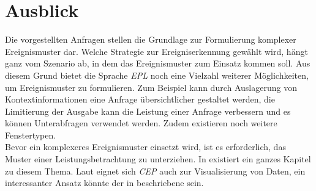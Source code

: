 \documentclass{acm_proc_article-sp}
\begin{document}
\section{Ausblick}
\vspace{0.1cm}
Die vorgestellten Anfragen stellen die Grundlage zur Formulierung komplexer 
Ereignismuster dar. Welche Strategie zur Ereigniserkennung gewählt wird, hängt ganz vom 
Szenario ab, in dem das Ereignismuster zum Einsatz kommen soll. Aus diesem Grund bietet 
die Sprache \textit{EPL} noch eine Vielzahl weiterer Möglichkeiten, um Ereignismuster zu 
formulieren. Zum Beispiel kann durch Auslagerung von Kontextinformationen eine Anfrage 
übersichtlicher gestaltet werden, die Limitierung der Ausgabe kann die Leistung einer 
Anfrage verbessern und es können Unterabfragen verwendet werden. Zudem existieren noch 
weitere Fenstertypen.\\
Bevor ein komplexeres Ereignismuster einsetzt wird, ist es erforderlich, das Muster einer 
Leistungsbetrachtung zu unterziehen. In \cite{esper-reference} existiert ein ganzes 
Kapitel zu diesem Thema. Laut \cite{eckert} eignet sich \textit{CEP} 
auch zur Visualisierung von Daten, ein interessanter Ansatz könnte der in \cite{perry} 
beschriebene sein.
\newpage
\appendix
\vspace{0.1cm}
%

%
%

\end{document}

